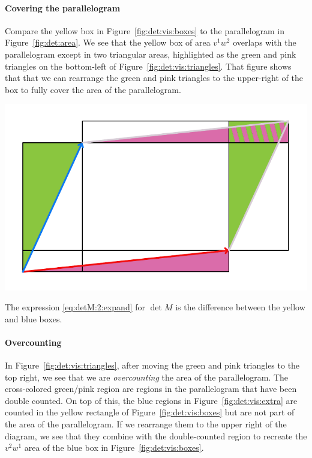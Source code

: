 \paragraph{Covering the parallelogram} Compare the yellow box in Figure~\ref{fig:det:vis:boxes} to the parallelogram in Figure~\ref{fig:det:area}. We see that the yellow box of area $v^1w^2$ overlaps with the parallelogram except in two triangular areas, highlighted as the green and pink triangles on the bottom-left of Figure~\ref{fig:det:vis:triangles}. That figure shows that that we can rearrange the green and pink triangles to the upper-right of the box to fully cover the area of the parallelogram. 
\begin{marginfigure}%
    \includegraphics[width=\textwidth]{figures/det TwoPiecesofDetall.pdf}
    \caption{The expression \eqref{eq:detM:2:expand} for $\det M$ is the difference between the yellow and blue boxes.}
    \label{fig:det:vis:triangles}
\end{marginfigure}

\paragraph{Overcounting} In Figure~\ref{fig:det:vis:triangles}, after moving the green and pink triangles to the top right, we see that we are \emph{overcounting} the area of the parallelogram. The cross-colored green/pink region are regions in the parallelogram that have been double counted. On top of this, the blue regions in Figure~\ref{fig:det:vis:extra} are counted in the yellow rectangle of Figure~\ref{fig:det:vis:boxes}  but are not part of the area of the parallelogram. If we rearrange them to the upper right of the diagram, we see that they combine with the double-counted region to recreate the $v^2w^1$ area of the blue box in Figure~\ref{fig:det:vis:boxes}. 

